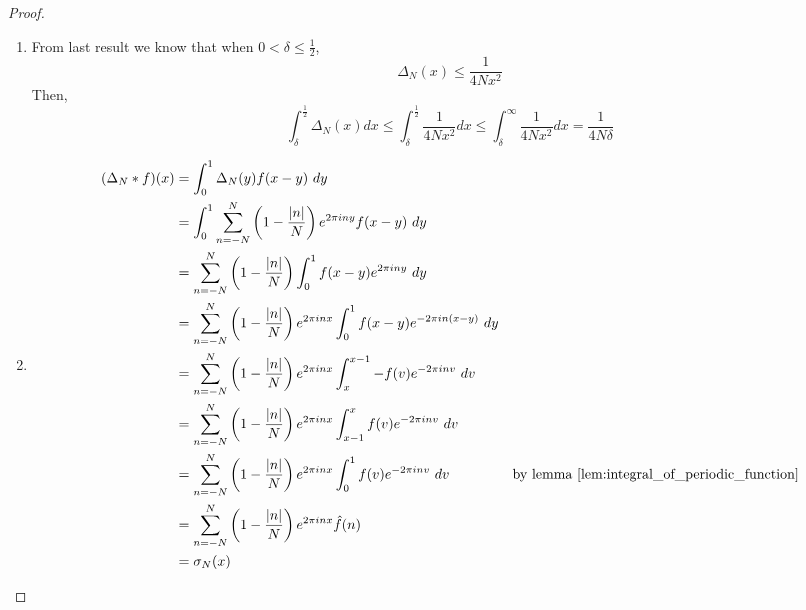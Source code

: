 \begin{proof}
\begin{enumerate}[label=(\alph*)]
      
     \item
       From last result we know that when $0< \delta \le \frac{1}{2}$, $$\Delta_N(x) \le \frac{1}{4Nx^2}$$
       Then,
        \begin{displaymath}
          \int_\delta^\frac{1}{2} \Delta_N(x) dx \le \int_\delta^\frac{1}{2} \frac{1}{4Nx^2} dx \le \int_\delta^\infty \frac{1}{4Nx^2} dx = \frac{1}{4N\delta}
        \end{displaymath}

    \item
      \begin{align*}
        (\Delta_N*f)(x) &= \int_0^1 \Delta_N(y)f(x-y) \ dy \\
              &= \int_0^1 \sum_{n=-N}^{N} \left(1-\frac{\lvert n\rvert}{N}\right)e^{2\pi iny} f(x-y) \ dy \\
              &= \sum_{n=-N}^N  \left(1-\frac{\lvert n\rvert}{N}\right) \int_0^1 f(x-y) e^{2\pi iny} \ dy \\
              &= \sum_{n=-N}^N  \left(1-\frac{\lvert n\rvert}{N}\right) e^{2 \pi inx}  \int_0^1 f(x-y) e^{-2\pi in \left( x-y \right) } \ dy \\
              &= \sum_{n=-N}^N  \left(1-\frac{\lvert n\rvert}{N}\right) e^{2 \pi inx} \int_x^{x-1} -f(v) e^{-2\pi in v} \ dv \\
              &= \sum_{n=-N}^N  \left(1-\frac{\lvert n\rvert}{N}\right) e^{2 \pi inx} \int_{x-1}^x f(v) e^{-2\pi in v} \ dv \\
              &= \sum_{n=-N}^N  \left(1-\frac{\lvert n\rvert}{N}\right) e^{2 \pi inx} \int_0^{1} f(v) e^{-2\pi in v} \ dv & \text{by lemma } \ref{lem:integral_of_periodic_function}\\
              &= \sum_{n=-N}^N  \left(1-\frac{\lvert n\rvert}{N}\right) e^{2 \pi inx} \hat{f}(n) \\
              &= \sigma_N(x)
      \end{align*}
    \end{enumerate}
\end{proof}
  

